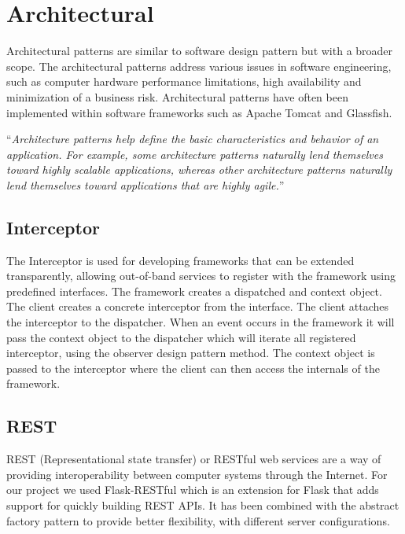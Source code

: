 \section{Architectural}
Architectural patterns are similar to software design pattern but with a broader scope. The architectural patterns address various issues in software engineering, such as computer hardware performance limitations, high availability and minimization of a business risk. Architectural patterns have often been implemented within software frameworks such as Apache Tomcat and Glassfish.

``\textit{Architecture patterns help define the basic characteristics and behavior of an application. For example, some architecture patterns naturally lend themselves toward highly scalable applications,
whereas other architecture patterns naturally lend themselves toward applications that are highly agile.}'' \citep{patterns}

\subsection{Interceptor}
The Interceptor is used for developing frameworks that can be extended transparently, allowing out-of-band services to register with the framework using predefined interfaces. The framework creates  a dispatched and context object. The client creates a concrete interceptor from the interface. The client attaches the interceptor to the dispatcher. When an event occurs in the framework it will pass the context object to the dispatcher which will iterate all registered interceptor, using the observer design pattern method. The context object is passed to the interceptor where the client can then access the internals of the framework.

\subsection{REST}
REST (Representational state transfer) or RESTful web services are a way of providing interoperability between computer systems through the Internet. For our project we used Flask-RESTful which is an extension for Flask that adds support for quickly building REST APIs. It has been combined with the abstract factory pattern to provide better flexibility, with different server configurations.

